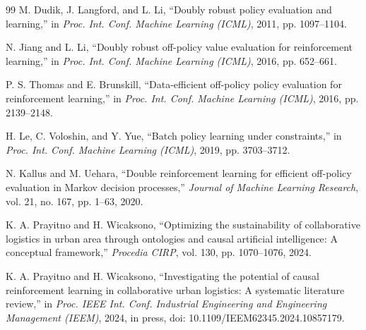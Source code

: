 \documentclass[a4paper,conference]{IEEEtran}
\begin{document}
\begin{thebibliography}{99}
 M. Dudik, J. Langford, and L. Li, ``Doubly robust policy evaluation and learning,'' in \emph{Proc. Int. Conf. Machine Learning (ICML)}, 2011, pp. 1097--1104.

 N. Jiang and L. Li, ``Doubly robust off-policy value evaluation for reinforcement learning,'' in \emph{Proc. Int. Conf. Machine Learning (ICML)}, 2016, pp. 652--661.

 P. S. Thomas and E. Brunskill, ``Data-efficient off-policy policy evaluation for reinforcement learning,'' in \emph{Proc. Int. Conf. Machine Learning (ICML)}, 2016, pp. 2139--2148.

 H. Le, C. Voloshin, and Y. Yue, ``Batch policy learning under constraints,'' in \emph{Proc. Int. Conf. Machine Learning (ICML)}, 2019, pp. 3703--3712.

 N. Kallus and M. Uehara, ``Double reinforcement learning for efficient off-policy evaluation in Markov decision processes,'' \emph{Journal of Machine Learning Research}, vol. 21, no. 167, pp. 1--63, 2020.

 K. A. Prayitno and H. Wicaksono, ``Optimizing the sustainability of collaborative logistics in urban area through ontologies and causal artificial intelligence: A conceptual framework,'' \emph{Procedia CIRP}, vol. 130, pp. 1070--1076, 2024.

 K. A. Prayitno and H. Wicaksono, ``Investigating the potential of causal reinforcement learning in collaborative urban logistics: A systematic literature review,'' in \emph{Proc. IEEE Int. Conf. Industrial Engineering and Engineering Management (IEEM)}, 2024, in press, doi: 10.1109/IEEM62345.2024.10857179.

\end{thebibliography}
\end{document}
